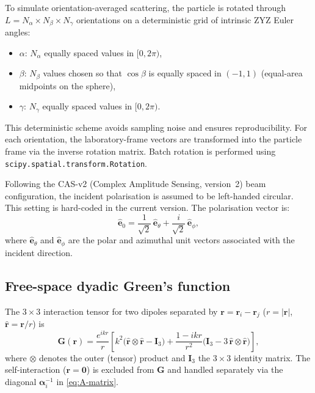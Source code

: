 \documentclass[11pt,a4paper]{article}
\begin{document}
To simulate orientation-averaged scattering, the particle is rotated through
$L = N_\alpha \times N_\beta \times N_\gamma$ orientations on a
deterministic grid of intrinsic ZYZ Euler angles:
\begin{itemize}
  \item $\alpha$: $N_\alpha$ equally spaced values in $[0, 2\pi)$,
  \item $\beta$: $N_\beta$ values chosen so that $\cos\beta$ is equally
        spaced in $(-1, 1)$ (equal-area midpoints on the sphere),
  \item $\gamma$: $N_\gamma$ equally spaced values in $[0, 2\pi)$.
\end{itemize}
This deterministic scheme avoids sampling noise and ensures reproducibility.
For each orientation, the laboratory-frame vectors are transformed into
the particle frame via the inverse rotation matrix.
Batch rotation is performed using \texttt{scipy.spatial.transform.Rotation}.

Following the CAS-v2 (Complex Amplitude Sensing, version~2) beam
configuration, the incident polarisation is assumed to be left-handed
circular.
This setting is hard-coded in the current version.
The polarisation vector is:
\begin{equation}
  \hat{\bm{e}}_0
    = \frac{1}{\sqrt{2}}\,\hat{\bm{e}}_\theta
      + \frac{i}{\sqrt{2}}\,\hat{\bm{e}}_\phi,
  \label{eq:circular-pol}
\end{equation}
where $\hat{\bm{e}}_\theta$ and $\hat{\bm{e}}_\phi$ are the polar and
azimuthal unit vectors associated with the incident direction.

\subsection{Free-space dyadic Green's function}
\label{sec:green-tensor}

The $3\times 3$ interaction tensor for two dipoles separated by
$\bm{r} = \bm{r}_i - \bm{r}_j$ ($r = |\bm{r}|$, $\hat{\bm{r}} = \bm{r}/r$)
is~\cite{Goodman1991}
\begin{equation}
  \mathbf{G}(\bm{r})
    = \frac{e^{ikr}}{r}
      \left[
        k^2 \bigl(\hat{\bm{r}} \otimes \hat{\bm{r}} - \mathbf{I}_3\bigr)
        + \frac{1 - ikr}{r^2}
          \bigl(\mathbf{I}_3 - 3\,\hat{\bm{r}} \otimes \hat{\bm{r}}\bigr)
      \right],
  \label{eq:green-tensor}
\end{equation}
where $\otimes$ denotes the outer (tensor) product and $\mathbf{I}_3$ the
$3\times 3$ identity matrix.
The self-interaction ($\bm{r} = \bm{0}$) is excluded from
$\mathbf{G}$ and handled separately via the diagonal
$\boldsymbol{\alpha}_i^{-1}$ in \eqref{eq:A-matrix}.
\end{document}
